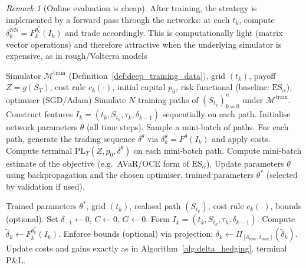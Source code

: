 \documentclass[12pt,a4paper]{article}
\theoremstyle{definition}
\theoremstyle{plain}
\theoremstyle{remark}
\newtheorem{remark}{Remark}[section]
\theoremstyle{plain}
\begin{document}
\label{subsubsec:deep_inference}

\begin{remark}[Online evaluation is cheap]
\label{rem:deep_inference_cheap}
After training, the strategy is implemented by a forward pass through the networks:
at each $t_k$, compute $\delta_k^{\mathrm{NN}}=F_k^{\theta_k^\ast}(I_k)$ and trade accordingly.
This is computationally light (matrix--vector operations) and therefore attractive when the underlying simulator is expensive,
as in rough/Volterra models \cite{Horvath2021DeepRough,BayerFriz2016}
\end{remark}

\label{subsubsec:deep_pseudocode}

\begin{algorithm}[H]
\caption{Deep hedging training loop (risk minimisation over simulated paths)}
\label{alg:deep_training}
\begin{algorithmic}[1]
\Require Simulator $\mathcal{M}^{\mathrm{train}}$ (Definition~\ref{def:deep_training_data}), grid $(t_k)$,
payoff $Z=g(S_T)$, cost rule $c_k(\cdot)$, initial capital $p_0$,
risk functional (baseline: $\mathrm{ES}_\alpha$), optimiser (SGD/Adam) \cite{Buehler2019DeepHedging,Horvath2021DeepRough}
\State Simulate $N$ training paths of $(S_{t_k})_{k=0}^n$ under $\mathcal{M}^{\mathrm{train}}$.
\State Construct features $I_k=(t_k,S_{t_k},\tau_k,\delta_{k-1})$ sequentially on each path.
\State Initialise network parameters $\theta$ (all time steps).
    \State Sample a mini-batch of paths.
    \State For each path, generate the trading sequence $\delta^\theta$ via $\delta_k^\theta=F^\theta(I_k)$ and apply costs.
    \State Compute terminal $\mathrm{PL}_T(Z,p_0,\delta^\theta)$ on each mini-batch path.
    \State Compute mini-batch estimate of the objective (e.g.\ AVaR/OCE form of $\mathrm{ES}_\alpha$).
    \State Update parameters $\theta$ using backpropagation and the chosen optimiser.
\EndFor
\State \Return trained parameters $\theta^\ast$ (selected by validation if used).
\end{algorithmic}
\end{algorithm}

\begin{algorithm}[H]
\caption{Deep hedging online execution on one realised path}
\label{alg:deep_online}
\begin{algorithmic}[1]
\Require Trained parameters $\theta^\ast$, grid $(t_k)$, realised path $(S_{t_k})$,
cost rule $c_k(\cdot)$, bounds (optional).
\State Set $\delta_{-1}\gets 0$, $C\gets 0$, $G\gets 0$.
    \State Form $I_k=(t_k,S_{t_k},\tau_k,\delta_{k-1})$.
    \State Compute $\tilde\delta_k \gets F_k^{\theta_k^\ast}(I_k)$.
    \State Enforce bounds (optional) via projection: $\delta_k\gets \Pi_{[\delta_{\min},\delta_{\max}]}(\tilde\delta_k)$.
    \State Update costs and gains exactly as in Algorithm~\ref{alg:delta_hedging}.
\EndFor
\State \Return terminal P\&L.
\end{algorithmic}
\end{algorithm}
\end{document}
